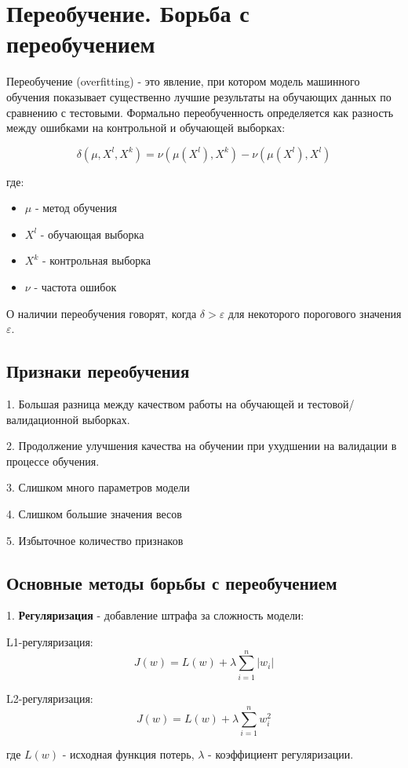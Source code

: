 \section*{Переобучение. Борьба с переобучением}

Переобучение (overfitting) - это явление, при котором модель машинного обучения показывает существенно лучшие результаты на обучающих данных по сравнению с тестовыми. Формально переобученность определяется как разность между ошибками на контрольной и обучающей выборках:

\[\delta(\mu, X^l, X^k) = \nu(\mu(X^l), X^k) - \nu(\mu(X^l), X^l)\]

где:
\begin{itemize}
   \item $\mu$ - метод обучения
   \item $X^l$ - обучающая выборка
   \item $X^k$ - контрольная выборка  
   \item $\nu$ - частота ошибок
\end{itemize}

О наличии переобучения говорят, когда $\delta > \varepsilon$ для некоторого порогового значения $\varepsilon$.

\subsection*{Признаки переобучения}

1. Большая разница между качеством работы на обучающей и тестовой/валидационной выборках.

2. Продолжение улучшения качества на обучении при ухудшении на валидации в процессе обучения.

3. Слишком много параметров модели

4. Слишком большие значения весов

5. Избыточное количество признаков

\subsection*{Основные методы борьбы с переобучением}

1. \textbf{Регуляризация} - добавление штрафа за сложность модели:

L1-регуляризация:
\[J(w) = L(w) + \lambda\sum_{i=1}^n |w_i|\]

L2-регуляризация:
\[J(w) = L(w) + \lambda\sum_{i=1}^n w_i^2\]

где $L(w)$ - исходная функция потерь, $\lambda$ - коэффициент регуляризации.

